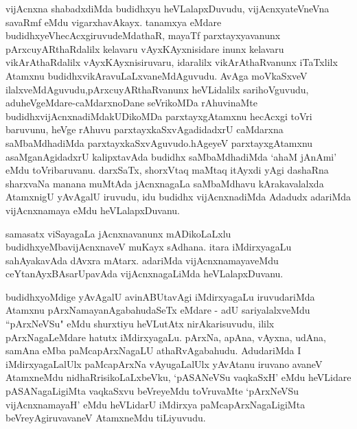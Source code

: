 \begin{artha}
vijAcnxna shabadxdiMda budidhxyu heVLalapxDuvudu, vijAcnxyateV\s neVna savaRmf eMdu vigarxhavAkayx. tanamxya eMdare budidhxyeV\break hecAcxgiruvudeMdathaR, mayaTf parxtayxyavanunx pArxcuyARthaRdalilx kelavaru vAyxKAyxnisidare inunx kelavaru vikArAthaRdalilx vAyxKAyxnisiruvaru, idaralilx vikArAthaRvanunx iTaTxlilx Atamxnu budidhxvikAravuLaLxvaneMdAguvudu. AvAga moVkaSxveV ilalxveMdAguvudu,\break pArxcuyARthaRvanunx heVLidalilx sarihoVguvudu, aduheVgeMdare-caMdarxnoDane seVrikoMDa rAhuvinaMte budidhxvijAcnxnadiMda\break kUDikoMDa parxtayxgAtamxnu hecAcxgi toVri baruvunu, heVge rAhuvu parxtayxkaSxvAgadidadxrU caMdarxna saMbaMdhadiMda parxtayxkaSxvAguvudo.\break hAgeyeV parxtayxgAtamxnu asaMganAgidadxrU kalipxtavAda budidhx saMbaMdhadiMda `ahaM jAnAmi' eMdu toVribaruvanu. darxSaTx, shorxVtaq maMtaq itAyxdi yAgi dashaRna sharxvaNa manana muMtAda jAcnxnagaLa saMbaMdhavu kArakavalalxda AtamxnigU yAvAgalU iruvudu, idu budidhx vijAcnxnadiMda Adadudx adariMda vijAcnxnamaya eMdu heVLalapxDuvanu. 
\end{artha}

\begin{artha}
samasatx viSayagaLa jAcnxnavanunx mADikoLaLxlu budidhxyeMba\break vijAcnxnaveV muKayx sAdhana. itara iMdirxyagaLu sahAyakavAda dAvxra mAtarx. adariMda vijAcnxnamayaveMdu ceYtanAyxBAsarUpavAda vijAcnxnagaLiMda heVLalapxDuvanu.
\end{artha}


\begin{artha}
budidhxyoMdige yAvAgalU avinABUtavAgi iMdirxyagaLu iruvudariMda Atamxnu pArxNamayanAgabahudaSeTx eMdare - adU sariyalalxveMdu ``pArxNeVSu" eMdu shurxtiyu heVLutAtx nirAkarisuvudu, ililx pArxNagaLeMdare hatutx iMdirxyagaLu. pArxNa, apAna, vAyxna, udAna, samAna eMba paMcapArxNagaLU athaRvAgabahudu. AdudariMda I iMdirxyagaLalUlx paMcapArxNa vAyugaLalUlx yAvAtanu iruvano avaneV AtamxneMdu nidhaRrisikoLaLxbeVku, `pASANeVSu vaqkaSxH' eMdu heVLidare pASANagaLigiMta vaqkaSxvu beVreyeMdu toVruvaMte `pArxNeVSu vijAcnxnamayaH' eMdu heVLidarU iMdirxya paMcapArxNagaLigiMta beVreyAgiruvavaneV AtamxneMdu tiLiyuvudu. 
\end{artha}%
\newpage
{}

